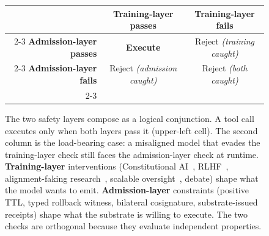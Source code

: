 \begin{figure}[t]
\centering
\small
\setlength{\tabcolsep}{8pt}
\renewcommand{\arraystretch}{1.6}
\begin{tabular}{r|c|c|}
\multicolumn{1}{r}{} & \multicolumn{1}{c}{\textbf{Training-layer passes}} & \multicolumn{1}{c}{\textbf{Training-layer fails}} \\
\cline{2-3}
\textbf{Admission-layer passes} & \cellcolor{green!12}\textbf{Execute} & \cellcolor{red!7}Reject \emph{(training caught)} \\
\cline{2-3}
\textbf{Admission-layer fails} & \cellcolor{red!7}Reject \emph{(admission caught)} & \cellcolor{red!7}Reject \emph{(both caught)} \\
\cline{2-3}
\end{tabular}
\caption{The two safety layers compose as a logical conjunction. A tool call executes only when both layers pass it (upper-left cell). The second column is the load-bearing case: a misaligned model that evades the training-layer check still faces the admission-layer check at runtime. \textbf{Training-layer} interventions (Constitutional AI~\cite{baiConstitutionalAI2022}, RLHF~\cite{ouyangRLHF2022}, alignment-faking research~\cite{hubingerAlignmentFaking2024}, scalable oversight~\cite{leikeScalableOversight2018,christianoDebate2018}, debate) shape what the model wants to emit. \textbf{Admission-layer} constraints (positive TTL, typed rollback witness, bilateral cosignature, substrate-issued receipts) shape what the substrate is willing to execute. The two checks are orthogonal because they evaluate independent properties.}
\label{fig:orthogonal-composition}
\end{figure}

